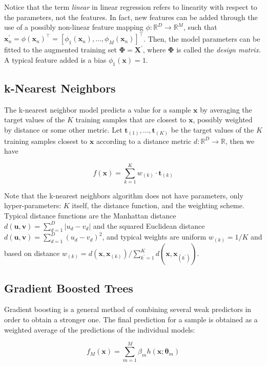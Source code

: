 \documentclass[a4paper]{book}
\begin{document}
Notice that the term \emph{linear} in linear regression refers to linearity with respect to the parameters, not the features. In fact, new features can be added through the use of a possibly non-linear feature mapping $\phi:\mathbb{R}^D\rightarrow\mathbb{R}^M$, such that $\bm x^\prime_n=\phi(\bm x_n)^\intercal=\left[\phi_1(\bm x_n),\ldots,\phi_M(\bm x_n)\right]^\intercal$. Then, the model parameters can be fitted to the augmented training set $\bm\Phi=\bm X^\prime$, where $\bm\Phi$ is called the \emph{design matrix}. A typical feature added is a bias $\phi_1(\bm x)=1$.

\subsection{k-Nearest Neighbors}
The k-nearest neighbor model \cite{knn} predicts a value for a sample $\bm x$ by averaging the target values of the $K$ training samples that are closest to $\bm x$, possibly weighted by distance or some other metric. Let $\bm t_{(1)},\ldots,\bm t_{(K)}$ be the target values of the $K$ training samples closest to $\bm x$ according to a distance metric $d:\mathbb{R}^D\rightarrow\mathbb{R}$, then we have

\begin{equation}
f(\bm x)=\sum_{k=1}^K w_{(k)}\cdot\bm t_{(k)}
\end{equation}


Note that the k-nearest neighbors algorithm does not have parameters, only hyper\hyp{}parameters: $K$ itself, the distance function, and the weighting scheme. Typical distance functions are the Manhattan distance $d(\bm u,\bm v)=\sum_{d=1}^D\vert u_d-v_d\vert$ and the squared Euclidean distance $d(\bm u,\bm v)=\sum_{d=1}^D(u_d-v_d)^2$, and typical weights are uniform $w_{(k)}=1/K$ and based on distance $w_{(k)}=d(\bm x,\bm x_{(k)})/\sum_{k^\prime=1}^K d(\bm x,\bm x_{(k^\prime)})$.

\subsection{Gradient Boosted Trees}
Gradient boosting \citep{gradientboosting} is a general method of combining several weak predictors in order to obtain a stronger one. The final prediction for a sample is obtained as a weighted average of the predictions of the individual models:

\begin{equation}
\label{eq:gboost}
f_M(\bm x)=\sum_{m=1}^M \beta_m h(\bm x;\bm\theta_m)
\end{equation}
\end{document}
